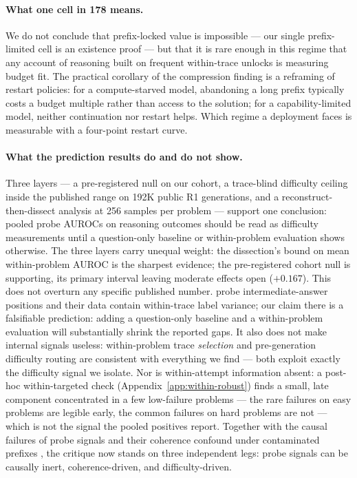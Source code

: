 
\paragraph{What one cell in 178 means.}
We do not conclude that prefix-locked value is impossible --- our single
prefix-limited cell is an existence proof --- but that it is rare enough
in this regime that any account of reasoning built on frequent
within-trace unlocks is measuring budget fit. The practical corollary of
the compression finding is a reframing of restart policies: for a
compute-starved model, abandoning a long prefix typically costs a budget
multiple rather than access to the solution; for a capability-limited model,
neither continuation nor restart helps. Which regime a deployment faces is
measurable with a four-point restart curve.

\paragraph{What the prediction results do and do not show.}
Three layers --- a pre-registered null on our cohort, a trace-blind
difficulty ceiling inside the published range on 192K public R1
generations, and a
reconstruct-then-dissect analysis at 256 samples per problem --- support one
conclusion: pooled probe AUROCs on reasoning outcomes should be read as
difficulty measurements until a question-only baseline or within-problem
evaluation shows otherwise. The three layers carry unequal weight: the
dissection's bound on mean within-problem AUROC is the sharpest evidence;
the pre-registered cohort null is supporting, its primary interval
leaving moderate effects open ($+0.167$). This does not overturn any specific
published number. \citet{zhang2025knowright} probe intermediate-answer
positions and their data contain within-trace label variance; our claim
there is a falsifiable prediction: adding a question-only baseline and a
within-problem evaluation will substantially shrink the reported gaps. It
also does not make internal signals useless: within-problem trace
\emph{selection} \citep{fu2025deepconf} and pre-generation difficulty
routing \citep{lugoloobi2026} are consistent with everything we find ---
both exploit exactly the difficulty signal we isolate. Nor is
within-attempt information absent: a post-hoc within-targeted check
(Appendix~\ref{app:within-robust}) finds a small, late component
concentrated in a few low-failure problems --- the rare failures on easy
problems are legible early, the common failures on hard problems are not
--- which is not the signal the pooled positives report. Together with the
causal failures of probe signals \citep{yuan2026diagnostic} and their
coherence confound under contaminated prefixes \citep{pair2026}, the
critique now stands on three independent legs: probe signals can be causally
inert, coherence-driven, and difficulty-driven.

